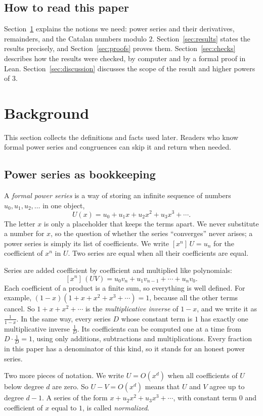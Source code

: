 \documentclass[11pt,a4paper]{article}
\theoremstyle{definition}
\theoremstyle{remark}
\newcommand{\coeff}[2]{[x^{#1}]\,#2}
\begin{document}
\subsection{How to read this paper}
Section~\ref{sec:background} explains the notions we need: power series and their derivatives, remainders, and the
Catalan numbers modulo $2$. Section~\ref{sec:results} states the results precisely, and Section~\ref{sec:proofs} proves
them. Section~\ref{sec:checks} describes how the results were checked, by computer and by a formal proof in Lean.
Section~\ref{sec:discussion} discusses the scope of the result and higher powers of $3$.
\section{Background}\label{sec:background}
This section collects the definitions and facts used later. Readers who know formal power series and congruences can skip it and return when needed.
\subsection{Power series as bookkeeping}
A \emph{formal power series} is a way of storing an infinite sequence of numbers $u_0,u_1,u_2,\dots$ in one object,
\[
U(x)=u_0+u_1x+u_2x^2+u_3x^3+\cdots .
\]
The letter $x$ is only a placeholder that keeps the terms apart. We never substitute a number for $x$, so the question
of whether the series ``converges'' never arises; a power series is simply its list of coefficients. We write
$\coeff{n}{U}=u_n$ for the coefficient of $x^n$ in $U$. Two series are equal when all their coefficients are equal.

Series are added coefficient by coefficient and multiplied like polynomials:
\[
\coeff{n}{(UV)}=u_0v_n+u_1v_{n-1}+\cdots+u_nv_0 .
\]
Each coefficient of a product is a finite sum, so everything is well defined. For example,
$(1-x)(1+x+x^2+x^3+\cdots)=1$, because all the other terms cancel. So $1+x+x^2+\cdots$ is the
\emph{multiplicative inverse} of $1-x$, and we write it as $\frac{1}{1-x}$. In the same way, every series $D$ whose
constant term is $1$ has exactly one multiplicative inverse $\frac1D$. Its coefficients can be computed one at a time
from $D\cdot\frac1D=1$, using only additions, subtractions and multiplications. Every fraction in this paper has a
denominator of this kind, so it stands for an honest power series.

Two more pieces of notation. We write $U=O(x^d)$ when all coefficients of $U$ below degree $d$ are zero. So
$U-V=O(x^d)$ means that $U$ and $V$ agree up to degree $d-1$. A series of the form $x+u_2x^2+u_3x^3+\cdots$, with
constant term $0$ and coefficient of $x$ equal to $1$, is called \emph{normalized}.
\end{document}
